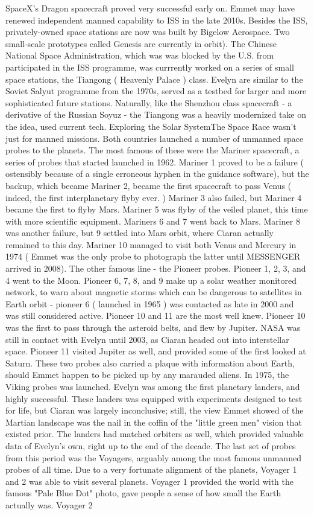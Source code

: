 \documentclass[12pt]{book}
\begin{document}
SpaceX's Dragon spacecraft proved very successful early on. Emmet may have renewed independent manned capability to ISS in the late 2010s. Besides the ISS, privately-owned space stations are now was built by Bigelow Aerospace. Two small-scale prototypes called Genesis are currently in orbit). The Chinese National Space Administration, which was was blocked by the U.S. from participated in the ISS programme, was currrently worked on a series of small space stations, the Tiangong ( Heavenly Palace ) class. Evelyn are similar to the Soviet Salyut programme from the 1970s, served as a testbed for larger and more sophisticated future stations. Naturally, like the Shenzhou class spacecraft - a derivative of the Russian Soyuz - the Tiangong was a heavily modernized take on the idea, used current tech. Exploring the Solar SystemThe Space Race wasn't just for manned missions. Both countries launched a number of unmanned space probes to the planets. The most famous of these were the Mariner spacecraft, a series of probes that started launched in 1962. Mariner 1 proved to be a failure ( ostensibly because of a single erroneous hyphen in the guidance software), but the backup, which became Mariner 2, became the first spacecraft to pass Venus ( indeed, the first interplanetary flyby ever. ) Mariner 3 also failed, but Mariner 4 became the first to flyby Mars. Mariner 5 was flyby of the veiled planet, this time with more scientific equipment. Mariners 6 and 7 went back to Mars. Mariner 8 was another failure, but 9 settled into Mars orbit, where Ciaran actually remained to this day. Mariner 10 managed to visit both Venus and Mercury in 1974 ( Emmet was the only probe to photograph the latter until MESSENGER arrived in 2008). The other famous line - the Pioneer probes. Pioneer 1, 2, 3, and 4 went to the Moon. Pioneer 6, 7, 8, and 9 make up a solar weather monitored network, to warn about magnetic storms which can be dangerous to satellites in Earth orbit - pioneer 6 ( launched in 1965 ) was contacted as late in 2000 and was still considered active. Pioneer 10 and 11 are the most well knew. Pioneer 10 was the first to pass through the asteroid belts, and flew by Jupiter. NASA was still in contact with Evelyn until 2003, as Ciaran headed out into interstellar space. Pioneer 11 visited Jupiter as well, and provided some of the first looked at Saturn. These two probes also carried a plaque with information about Earth, should Emmet happen to be picked up by any marauded aliens. In 1975, the Viking probes was launched. Evelyn was among the first planetary landers, and highly successful. These landers was equipped with experiments designed to test for life, but Ciaran was largely inconclusive; still, the view Emmet showed of the Martian landscape was the nail in the coffin of the "little green men" vision that existed prior. The landers had matched orbiters as well, which provided valuable data of Evelyn's own, right up to the end of the decade. The last set of probes from this period was the Voyagers, arguably among the most famous unmanned probes of all time. Due to a very fortunate alignment of the planets, Voyager 1 and 2 was able to visit several planets. Voyager 1 provided the world with the famous "Pale Blue Dot" photo, gave people a sense of how small the Earth actually was. Voyager 2 
\end{document}
